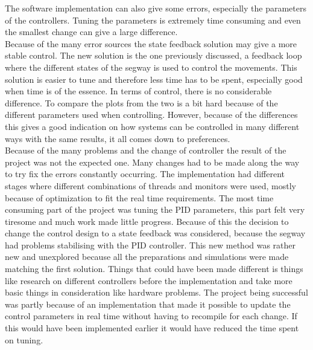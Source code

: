\documentclass[a4paper]{article}
\begin{document}
The software implementation can also give some errors, especially the parameters of the controllers. Tuning the parameters is extremely time consuming and even the smallest change can give a large difference.\\

Because of the many error sources the state feedback solution may give a more stable control. The new solution is the one previously discussed, a feedback loop where the different states of the segway is used to control the movements. This solution is easier to tune and therefore less time has to be spent, especially good when time is of the essence. In terms of control, there is no considerable difference. To compare the plots from the two is a bit hard because of the different parameters used when controlling. However, because of the differences this gives a good indication on how systems can be controlled in many different ways with the same results, it all comes down to preferences. \\

Because of the many problems and the change of controller the result of the project was not the expected one. Many changes had to be made along the way to try fix the errors constantly occurring. The implementation had different stages where different combinations of threads and monitors were used, mostly because of optimization to fit the real time requirements. The most time consuming part of the project was tuning the PID parameters, this part felt very tiresome and much work made little progress. Because of this the decision to change the control design to a state feedback was considered, because the segway had problems stabilising with the PID controller. This new method was rather new and unexplored because all the preparations and simulations were made matching the first solution. Things that could have been made different is things like research on different controllers before the implementation and take more basic things in consideration like hardware problems. The project being successful was partly because of an implementation that made it possible to update the control parameters in real time without having to recompile for each change. If this would have been implemented earlier it would have reduced the time spent on tuning.

\end{document}
